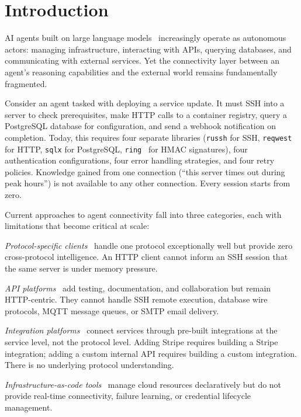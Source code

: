 \documentclass[10pt, twocolumn]{article}
\begin{document}
\section{Introduction}
\label{sec:intro}

AI agents built on large language models~\cite{vaswani2017attention} increasingly operate as autonomous actors: managing infrastructure, interacting with APIs, querying databases, and communicating with external services. Yet the connectivity layer between an agent's reasoning capabilities and the external world remains fundamentally fragmented.

Consider an agent tasked with deploying a service update. It must SSH into a server to check prerequisites, make HTTP calls to a container registry, query a PostgreSQL database for configuration, and send a webhook notification on completion. Today, this requires four separate libraries (\texttt{russh} for SSH, \texttt{reqwest}~\cite{reqwest2024} for HTTP, \texttt{sqlx} for PostgreSQL, \texttt{ring}~\cite{ring2024} for HMAC signatures), four authentication configurations, four error handling strategies, and four retry policies. Knowledge gained from one connection (``this server times out during peak hours'') is not available to any other connection. Every session starts from zero.

Current approaches to agent connectivity fall into three categories, each with limitations that become critical at scale:

\emph{Protocol-specific clients}~\cite{reqwest2024} handle one protocol exceptionally well but provide zero cross-protocol intelligence. An HTTP client cannot inform an SSH session that the same server is under memory pressure.

\emph{API platforms}~\cite{postman2024} add testing, documentation, and collaboration but remain HTTP-centric. They cannot handle SSH remote execution, database wire protocols, MQTT message queues, or SMTP email delivery.

\emph{Integration platforms}~\cite{zapier2024} connect services through pre-built integrations at the service level, not the protocol level. Adding Stripe requires building a Stripe integration; adding a custom internal API requires building a custom integration. There is no underlying protocol understanding.

\emph{Infrastructure-as-code tools}~\cite{terraform2024} manage cloud resources declaratively but do not provide real-time connectivity, failure learning, or credential lifecycle management.
\end{document}
